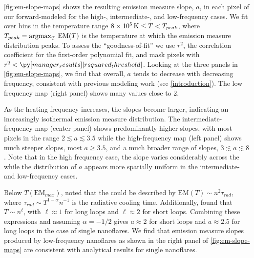 \autoref{fig:em-slope-maps} shows the resulting emission measure slope, $a$, in each pixel of our forward-modeled \AR{} for the high-, intermediate-, and low-frequency cases. We fit \dem{} over bins in the temperature range $8\times10^{5}\,\textup{K}\le T< T_{peak}$, where $T_{peak}=\operatorname*{argmax}_T\,\mathrm{EM}(T)$ is the temperature at which the emission measure distribution peaks. To assess the ``goodness-of-fit'' we use $r^2$, the correlation coefficient for the first-order polynomial fit, and mask pixels with $r^2<\py[manager_results]|rsquared_threshold|$. Looking at the three panels in \autoref{fig:em-slope-maps}, we find that overall, $a$ tends to decrease with decreasing frequency, consistent with previous modeling work (see \autoref{introduction}). The low frequency map (right panel) shows many values close to 2.

As the heating frequency increases, the slopes become larger, indicating an increasingly isothermal emission measure distribution. The intermediate-frequency map (center panel) shows predominantly higher slopes, with most pixels in the range $2\lesssim a \lesssim 3.5$ while the high-frequency map (left panel) shows much steeper slopes, most $a\ge3.5$, and a much broader range of slopes, $3\lesssim a \lesssim 8$. Note that in the high frequency case, the slope varies considerably across the \AR{} while the distribution of $a$ appears more spatially uniform in the intermediate- and low-frequency cases.

Below $T(\mathrm{EM}_{max})$, \citet{cargill_implications_1994} noted that the \dem{} could be described by $\mathrm{EM}(T)\sim n^2\tau_{rad}$, where $\tau_{rad}\sim T^{1-\alpha}n^{-1}$ is the radiative cooling time. Additionally, \citet{bradshaw_cooling_2010} found that $T\sim n^{\ell}$, with $\ell\approx1$ for long loops and $\ell\approx2$ for short loops. Combining these expressions and assuming $\alpha=-1/2$ \citep[i.e. using the radiative losses of][]{rosner_dynamics_1978} gives $a\approx2$ for short loops and $a\approx2.5$ for long loops in the case of single nanoflares. We find that emission measure slopes produced by low-frequency nanoflares as shown in the right panel of \autoref{fig:em-slope-maps} are consistent with analytical results for single nanoflares.

